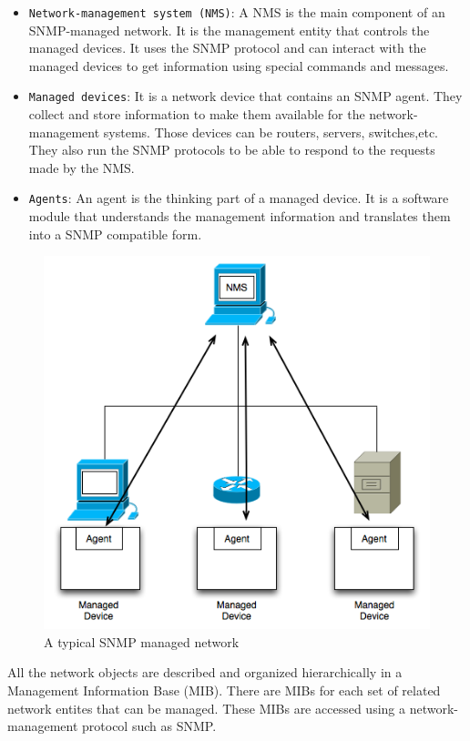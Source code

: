 \begin{itemize}
	\item \texttt{Network-management system (NMS)}: A NMS is the main component of an SNMP-managed network. It is the management entity that controls the managed devices. It uses the SNMP protocol and can interact with the managed devices to get information using special commands and messages.
	
	\item \texttt{Managed devices}: It is a network device that contains an SNMP agent. They collect and store information to make them available for the network-management systems. Those devices can be routers, servers, switches,etc. They also run the SNMP protocols to be able to respond to the requests made by the NMS.
	
	\item \texttt{Agents}: An agent is the thinking part of a managed device. It is a software module that understands the management information and translates them into a SNMP compatible form.
\end{itemize}

\begin{figure}[H]
\centering
	\includegraphics[width=.7\linewidth]{Pictures/Chapter2/snmp.png}
	\caption{A typical SNMP managed network}
\end{figure}

All the network objects are described and organized hierarchically in a Management Information Base (MIB). There are MIBs for each set of related network entites that can be managed. These MIBs are accessed using a network-management protocol such as SNMP.




